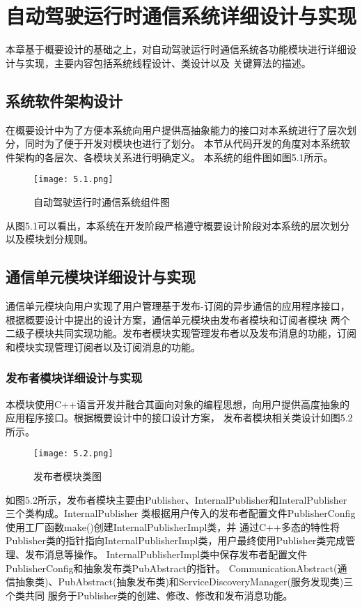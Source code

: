 \chapter{自动驾驶运行时通信系统详细设计与实现}
本章基于概要设计的基础之上，对自动驾驶运行时通信系统各功能模块进行详细设计与实现，主要内容包括系统线程设计、类设计以及
关键算法的描述。

\section{系统软件架构设计}
在概要设计中为了方便本系统向用户提供高抽象能力的接口对本系统进行了层次划分，同时为了便于开发对模块也进行了划分。
本节从代码开发的角度对本系统软件架构的各层次、各模块关系进行明确定义。
本系统的组件图如图5.1所示。
\begin{figure}[H]
    \centering
    \texttt{[image: 5.1.png]}
    \caption{自动驾驶运行时通信系统组件图}
    \label{fig:1}
  \end{figure}
从图5.1可以看出，本系统在开发阶段严格遵守概要设计阶段对本系统的层次划分以及模块划分规则。

\section{通信单元模块详细设计与实现}
通信单元模块向用户实现了用户管理基于发布-订阅的异步通信的应用程序接口，根据概要设计中提出的设计方案，通信单元模块由发布者模块和订阅者模块
两个二级子模块共同实现功能。发布者模块实现管理发布者以及发布消息的功能，订阅和模块实现管理订阅者以及订阅消息的功能。

\subsection{发布者模块详细设计与实现}
本模块使用C++语言开发并融合其面向对象的编程思想，向用户提供高度抽象的应用程序接口。根据概要设计中的接口设计方案，
发布者模块相关类设计如图5.2所示。
\begin{figure}[H]
  \centering
  \texttt{[image: 5.2.png]}
  \caption{发布者模块类图}
  \label{fig:2}
\end{figure}
如图5.2所示，发布者模块主要由Publisher、InternalPublisher和InteralPublisher三个类构成。InternalPublisher
类根据用户传入的发布者配置文件PublisherConfig使用工厂函数make()创建InternalPublisherImpl类，并
通过C++多态的特性将Publisher类的指针指向InternalPublisherImpl类，用户最终使用Publisher类完成管理、发布消息等操作。
InternalPublisherImpl类中保存发布者配置文件PublisherConfig和抽象发布类PubAbstract的指针。
CommunicationAbstract(通信抽象类)、PubAbstract(抽象发布类)和ServiceDiscoveryManager(服务发现类)三个类共同
服务于Publisher类的创建、修改、修改和发布消息功能。

